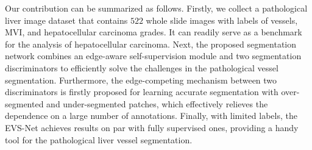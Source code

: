 \documentclass[letterpaper]{article} %
\begin{document}
Our contribution can be summarized as follows.
Firstly, we collect a pathological liver image dataset
that contains $522$ whole slide images with labels of vessels,
MVI, and hepatocellular carcinoma grades.
It can readily serve as  a benchmark for the analysis of hepatocellular carcinoma.
Next, the proposed segmentation network combines an edge-aware self-supervision module and two segmentation discriminators to
efficiently solve the challenges in the pathological vessel segmentation.
Furthermore, the edge-competing mechanism between two discriminators is firstly proposed for learning accurate segmentation
with over-segmented and under-segmented patches, which  effectively relieves the dependence on a large number of annotations.
Finally, with limited labels, the EVS-Net achieves results on par with fully supervised ones,
providing a handy tool for the pathological liver vessel segmentation.






%

%
\end{document}
